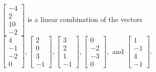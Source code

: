 \begin{exercise}
\begin{exerciseStatement}
  \end{exerciseStatement}
  \begin{exerciseAnswer}
   \(\left[\begin{array}{c}
-4 \\
2 \\
10 \\
-2
\end{array}\right]\) 
  	 is  
	a linear combination of the vectors \(\left[\begin{array}{c}
4 \\
-1 \\
-2 \\
0
\end{array}\right] , \left[\begin{array}{c}
2 \\
0 \\
3 \\
-1
\end{array}\right] , \left[\begin{array}{c}
3 \\
2 \\
1 \\
-1
\end{array}\right] , \left[\begin{array}{c}
0 \\
-2 \\
-3 \\
0
\end{array}\right] , \text{ and } \left[\begin{array}{c}
1 \\
-1 \\
4 \\
-1
\end{array}\right]\).

	
  


  \end{exerciseAnswer}
\end{exercise}